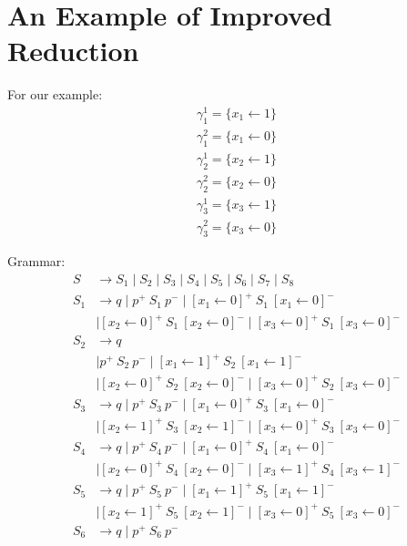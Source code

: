 \section{An Example of Improved Reduction}

For our example:
\begin{align*}
\gamma_1^1 = \{x_1 \leftarrow 1 \} \\
\gamma_1^2 = \{x_1 \leftarrow 0 \} \\
\gamma_2^1 = \{x_2 \leftarrow 1 \} \\
\gamma_2^2 = \{x_2 \leftarrow 0 \} \\
\gamma_3^1 = \{x_3 \leftarrow 1 \} \\
\gamma_3^2 = \{x_3 \leftarrow 0 \} 
\end{align*}

Grammar:
\begin{align*}
S & \to S_1 \mid S_2 \mid S_3 \mid S_4 \mid S_5 \mid S_6 \mid S_7 \mid S_8\\
S_1 & \to q \mid p^+ \ S_1 \ p^- 
      \mid [x_1 \leftarrow 0]^+ \ S_1 \ [x_1 \leftarrow 0]^- \\ 
    & \mid [x_2 \leftarrow 0]^+ \ S_1 \ [x_2 \leftarrow 0]^- 
      \mid [x_3 \leftarrow 0]^+ \ S_1 \ [x_3 \leftarrow 0]^- \\
S_2 & \to q \\
    & \mid p^+ \ S_2 \ p^- 
      \mid [x_1 \leftarrow 1]^+ \ S_2 \ [x_1 \leftarrow 1]^- \\ 
    & \mid [x_2 \leftarrow 0]^+ \ S_2 \ [x_2 \leftarrow 0]^- 
      \mid [x_3 \leftarrow 0]^+ \ S_2 \ [x_3 \leftarrow 0]^- \\
S_3 & \to q \mid p^+ \ S_3 \ p^- 
      \mid [x_1 \leftarrow 0]^+ \ S_3 \ [x_1 \leftarrow 0]^- \\ 
    & \mid [x_2 \leftarrow 1]^+ \ S_3 \ [x_2 \leftarrow 1]^- 
      \mid [x_3 \leftarrow 0]^+ \ S_3 \ [x_3 \leftarrow 0]^- \\
S_4 & \to q \mid p^+ \ S_4 \ p^- 
      \mid [x_1 \leftarrow 0]^+ \ S_4 \ [x_1 \leftarrow 0]^- \\ 
    & \mid [x_2 \leftarrow 0]^+ \ S_4 \ [x_2 \leftarrow 0]^- 
      \mid [x_3 \leftarrow 1]^+ \ S_4 \ [x_3 \leftarrow 1]^- \\
S_5 & \to q \mid p^+ \ S_5 \ p^- 
      \mid [x_1 \leftarrow 1]^+ \ S_5 \ [x_1 \leftarrow 1]^- \\ 
    & \mid [x_2 \leftarrow 1]^+ \ S_5 \ [x_2 \leftarrow 1]^- 
      \mid [x_3 \leftarrow 0]^+ \ S_5 \ [x_3 \leftarrow 0]^- \\
S_6 & \to q \mid p^+ \ S_6 \ p^- 

\end{align*}
